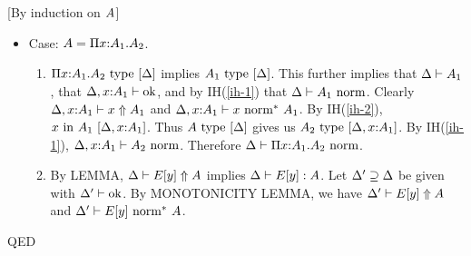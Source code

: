 \documentclass{article}
\newcommand{\qed}{\mbox{QED}}
\newenvironment{proof}{\noindent{\bf Proof:}\hspace*{0.5em}}{\hspace*{\fill}\qed}
\theoremstyle{break}
\begin{document}
\begin{proof}[By induction on $\kind$]
\begin{itemize}
\item Case: $\kind=\kpi{\cvar}{\kind_1}{\kind_2}$.
\begin{enumerate}
\item 
$\semanticvalidtype{\world}{\kpi{\cvar}{\kind_1}{\kind_2}}$ implies
$\semanticvalidtype{\world}{\kind_1}$.  This further implies that
$\validkind{\world}{\kind_1}$, that $\validcontext{\world,\cvar{:}\kind_1}$, and
by IH(\ref{ih-1}) that $\normtype{\world}{\kind_1}$.
Clearly $\reconstruct{\world,\cvar{:}\kind_1}{\cvar}{\kind_1}$ and 
$\normE{\world,\cvar{:}\kind_1}{\cvar}{\kind_1}$.  By
IH(\ref{ih-2}), $\semanticvalidterm{\world,\cvar{:}\kind_1}{\cvar}{\kind_1}$.
Thus $\semanticvalidtype{\world}{\kind}$ gives us
$\semanticvalidtype{\world,\cvar{:}\kind_1}{\kind_2}$.  By IH(\ref{ih-1}),
$\normtype{\world,\cvar{:}\kind_1}{\kind_2}$.  Therefore
$\normtype{\world}{\kpi{\cvar}{\kind_1}{\kind_2}}$.
\item By LEMMA, $\reconstruct{\world}{E[\othercvar]}{\kind}$ implies
$\validconstructor{\world}{E[\othercvar]}{\kind}$.
Let $\world'\supseteq\world$ be given with $\validcontext{\world'}$.
By MONOTONICITY LEMMA, we have $\reconstruct{\world'}{E[\othercvar]}{\kind}$ and
$\normE{\world'}{E[\othercvar]}{\kind}$.
\end{enumerate}
\end{itemize}
\end{proof}
\end{document}
